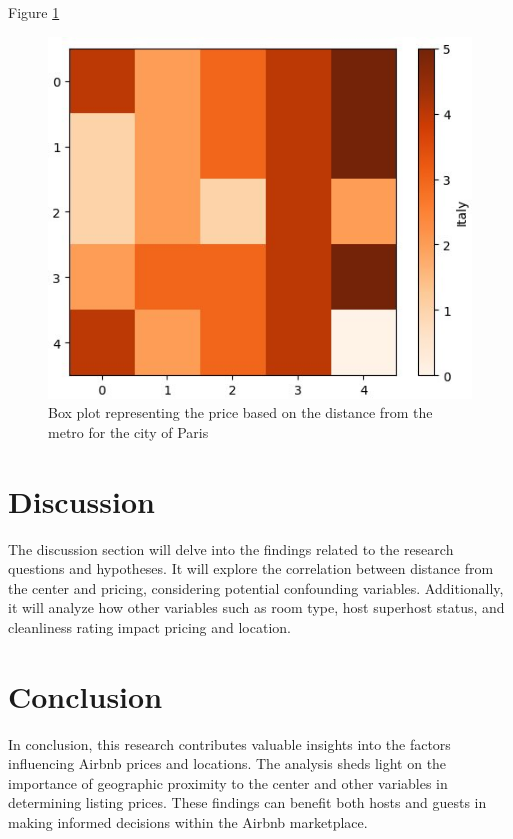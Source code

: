 \documentclass[10pt, conference, compsocconf]{IEEEtran}
\begin{document}
Figure \ref{fig:heat-map} \lipsum[1]
\begin{figure}[ht]
  \centering
  \includegraphics[width=\columnwidth]{figures/heat-map.jpg}
  \caption{Box plot representing the price based on the distance from the metro for the city of Paris}
  \label{fig:heat-map}
\end{figure}

\section{Discussion}
The discussion section will delve into the findings related to the research questions and hypotheses. 
It will explore the correlation between distance from the center and pricing, considering potential confounding variables. 
Additionally, it will analyze how other variables such as room type, host superhost status, and cleanliness rating impact pricing and location.

\lipsum[1]

\lipsum[2]

\lipsum[3-4]

\section{Conclusion}
In conclusion, this research contributes valuable insights into the factors influencing Airbnb prices and locations. 
The analysis sheds light on the importance of geographic proximity to the center and other variables in determining listing prices. 
These findings can benefit both hosts and guests in making informed decisions within the Airbnb marketplace.
\end{document}
